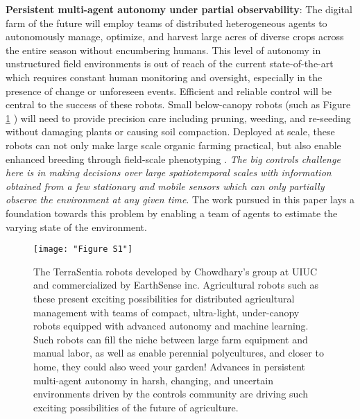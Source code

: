 \textbf{Persistent multi-agent autonomy under partial observability}:  The digital farm of the future will employ teams of distributed heterogeneous agents to autonomously manage, optimize, and harvest large acres of diverse crops across the entire season without encumbering humans. This level of autonomy in unstructured field environments is out of reach of the current state-of-the-art which requires constant human monitoring and oversight, especially in the presence of change or unforeseen events. Efficient and reliable control will be central to the success of these robots. Small below-canopy robots (such as Figure \ref{fig:terrasentia} \cite{kayacan2018embedded}) will need to provide precision care including pruning, weeding, and re-seeding without damaging plants or causing soil compaction. Deployed at scale, these robots can not only make large scale organic farming practical, but also enable enhanced breeding through  field-scale phenotyping \cite{kayacan2018embedded,mueller2017robotanist,virlet2017field}. \textit{The big controls challenge here is in making decisions over large spatiotemporal scales with information obtained from a few stationary and mobile sensors which can only partially observe the environment at any given time}. The work pursued in this paper lays a foundation towards this problem by enabling a team of agents to estimate the varying state of the environment. 

\begin{figure}
\texttt{[image: "Figure S1"]}
\caption{The TerraSentia robots developed by Chowdhary's group at UIUC and commercialized by EarthSense inc. Agricultural robots such as these present exciting possibilities for distributed agricultural management with teams of compact, ultra-light, under-canopy robots equipped with advanced autonomy and machine learning. Such robots can fill the niche between large farm equipment and manual labor, as well as enable perennial polycultures, and closer to home,  they could also weed your garden! Advances in persistent multi-agent autonomy in harsh, changing, and uncertain environments driven by the controls community are driving such exciting possibilities of the future of agriculture.}
\label{fig:terrasentia}
\end{figure}



